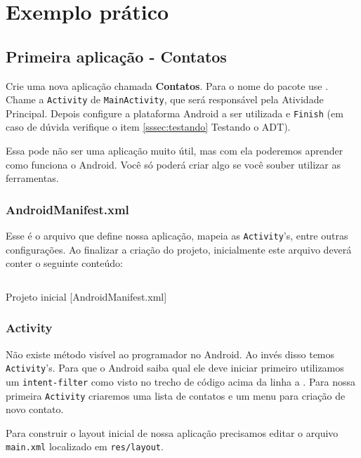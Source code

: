 \chapter{Exemplo prático}

\section{Primeira aplicação - Contatos}

Crie uma nova aplicação chamada \textbf{Contatos}. Para o nome do pacote use .
Chame a \texttt{Activity} de \texttt{MainActivity}, que será responsável pela Atividade Principal. Depois
configure a plataforma Android a ser utilizada e \texttt{Finish} (em caso de dúvida verifique o item
\ref{sssec:testando} Testando o ADT).

Essa pode não ser uma aplicação muito útil, mas com ela poderemos aprender como funciona o Android. Você
só poderá criar algo se você souber utilizar as ferramentas.

\subsection{AndroidManifest.xml}

Esse é o arquivo que define nossa aplicação, mapeia as \texttt{Activity}'s, entre outras configurações. Ao finalizar
a criação do projeto, inicialmente este arquivo deverá conter o seguinte conteúdo:

\begin{listing}[H]
  \inputminted[linenos=true,frame=bottomline,tabsize=3]{ xml }{ source/AndroidManifest-1.xml }
  \caption{Projeto inicial [AndroidManifest.xml]}
\end{listing}

\subsection{Activity\label{ssec:act}}

Não existe método  visível ao programador no Android. Ao invés disso temos \texttt{Activity}'s.
Para que o Android saiba qual ele deve iniciar primeiro utilizamos um \texttt{intent-filter} como visto
no trecho de código acima da linha  a .
Para nossa primeira \texttt{Activity} criaremos uma lista de contatos e um menu para criação de novo contato.

Para construir o layout inicial de nossa aplicação precisamos editar o arquivo \texttt{main.xml} localizado em
\texttt{res/layout}.

